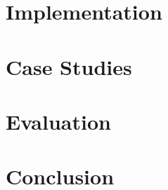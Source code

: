 \documentclass[11pt,twoside,final,natbib=false]{mitthesis}
\begin{document}
\chapter{Implementation}%
\label{ch:impl}


\chapter{Case Studies}%
\label{ch:case_studies}


\chapter{Evaluation}%
\label{ch:eval}


\chapter{Conclusion}%
\label{ch:conclusion}



\printbibliography

%
\end{document}
